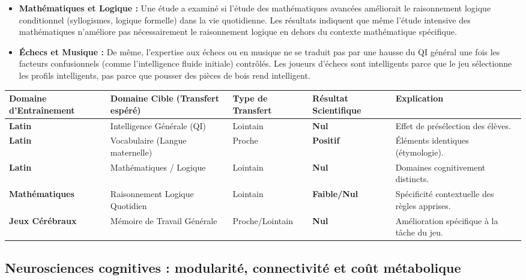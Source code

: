 \begin{itemize}\item \textbf{Mathématiques et Logique :} Une étude a examiné si l'étude des mathématiques avancées améliorait le raisonnement logique conditionnel (syllogismes, logique formelle) dans la vie quotidienne. Les résultats indiquent que même l'étude intensive des mathématiques n'améliore pas nécessairement le raisonnement logique en dehors du contexte mathématique spécifique.\cite{II-1-1-ref16}\item \textbf{Échecs et Musique :} De même, l'expertise aux échecs ou en musique ne se traduit pas par une hausse du QI général une fois les facteurs confusionnels (comme l'intelligence fluide initiale) contrôlés. Les joueurs d'échecs sont intelligents parce que le jeu sélectionne les profils intelligents, pas parce que pousser des pièces de bois rend intelligent.\cite{II-1-1-ref26}\end{itemize}\begin{table}[h!]\small\centering\begin{tabular}{| l | l | l | l | l |}\hline\textbf{Domaine d'Entraînement} & \textbf{Domaine Cible (Transfert espéré)} & \textbf{Type de Transfert} & \textbf{Résultat Scientifique} & \textbf{Explication} \\ \hline\textbf{Latin} & Intelligence Générale (QI) & Lointain & \textbf{Nul} & Effet de présélection des élèves. \\ \hline\textbf{Latin} & Vocabulaire (Langue maternelle) & Proche & \textbf{Positif} & Éléments identiques (étymologie). \\ \hline\textbf{Latin} & Mathématiques / Logique & Lointain & \textbf{Nul} & Domaines cognitivement distincts. \\ \hline\textbf{Mathématiques} & Raisonnement Logique Quotidien & Lointain & \textbf{Faible/Nul} & Spécificité contextuelle des règles apprises. \\ \hline\textbf{Jeux Cérébraux} & Mémoire de Travail Générale & Proche/Lointain & \textbf{Nul} & Amélioration spécifique à la tâche du jeu. \\ \hline\end{tabular}\end{table}

\subsection{Neurosciences cognitives : modularité, connectivité et coût métabolique}

